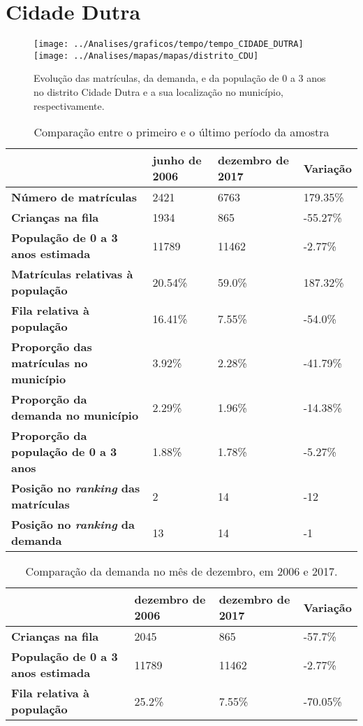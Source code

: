 \section{Cidade Dutra}
\begin{figure}[H]
\centering
\texttt{[image: ../Analises/graficos/tempo/tempo\_CIDADE\_DUTRA]}
\texttt{[image: ../Analises/mapas/mapas/distrito\_CDU]}
\caption{Evolução das matrículas, da demanda, e da população de 0 a 3 anos no distrito Cidade Dutra e a sua localização no município, respectivamente.}
\end{figure}
\begin{table}[H]
\begin{tabular}{l|l|l|l}
\textbf{}                                      & \textbf{junho de 2006}       & \textbf{dezembro de 2017}    & \textbf{Variação} \\ \hline
\textbf{Número de matrículas}                  & 2421 & 6763 & 179.35\% \\ \hline
\textbf{Crianças na fila}                      & 1934 & 865 & -55.27\% \\ \hline
\textbf{População de 0 a 3 anos estimada}      & 11789 & 11462 & -2.77\% \\ \hline
\textbf{Matrículas relativas à população}      & 20.54\% & 59.0\% & 187.32\% \\ \hline
\textbf{Fila relativa à população}             & 16.41\% & 7.55\% & -54.0\% \\ \hline
\textbf{Proporção das matrículas no município} & 3.92\% & 2.28\% & -41.79\% \\ \hline
\textbf{Proporção da demanda no município}     & 2.29\% & 1.96\% & -14.38\% \\ \hline
\textbf{Proporção da população de 0 a 3 anos}  & 1.88\% & 1.78\% & -5.27\% \\ \hline
\textbf{Posição no \textit{ranking} das matrículas}     & 2 & 14 & -12 \\ \hline
\textbf{Posição no \textit{ranking} da demanda}         & 13 & 14 & -1 \\ 
\end{tabular}
\caption{Comparação entre o primeiro e o último período da amostra}
\end{table}
\begin{table}[H]
\begin{tabular}{l|l|l|l}
\textbf{}                                 & \textbf{dezembro de 2006} & \textbf{dezembro de 2017} & \textbf{Variação} \\ \hline
\textbf{Crianças na fila}                      & 2045 & 865 & -57.7\% \\ \hline
\textbf{População de 0 a 3 anos estimada}      & 11789 & 11462 & -2.77\% \\ \hline
\textbf{Fila relativa à população}             & 25.2\% & 7.55\% & -70.05\% \\
\end{tabular}
\caption{Comparação da demanda no mês de dezembro, em 2006 e 2017.}
\end{table}
